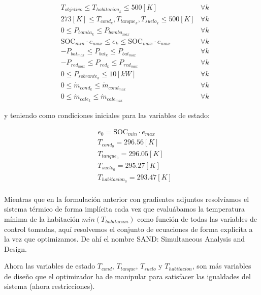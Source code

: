 \begin{align}
	 & T_{objetivo} \leq T_{habitacion_k} \leq 500[K]  \label{eq:min_t_habitacion_constraint_sand} & \forall k \\
	 & 273[K] \leq T_{cond_k}, T_{tanque_k}, T_{suelo_k} \leq 500[K]                               & \forall k \\
	 & 0 \leq P_{bomba_k} \leq P_{bomba_{max}} \quad                                               & \forall k \\
	 & \text{SOC}_{min} \cdot e_{max} \leq e_k \leq \text{SOC}_{max} \cdot e_{max} \quad           & \forall k \\
	 & -P_{bat_{max}} \leq P_{bat_k} \leq P_{bat_{max}} \quad                                      & \forall k \\
	 & -P_{red_{max}} \leq P_{red_k} \leq P_{red_{max}} \quad                                      & \forall k \\
	 & 0 \leq P_{sobrante_k} \leq 10[kW] \quad                                                     & \forall k \\
	 & 0 \leq \dot{m}_{cond_k} \leq \dot{m}_{cond_{max}} \quad                                     & \forall k \\
	 & 0 \leq \dot{m}_{cale_k} \leq \dot{m}_{cale_{max}} \quad                                     & \forall k
\end{align}

y teniendo como condiciones iniciales para las variables de estado:

\begin{align}
	 & e_0 = \text{SOC}_{min} \cdot e_{max} \\
	 & T_{cond_0} = 296.56 [K]              \\
	 & T_{tanque_0} = 296.05[K]             \\
	 & T_{suelo_0} = 295.27[K]              \\
	 & T_{habitacion_0} = 293.47[K]         \\
\end{align}


Mientras que en la formulación anterior con gradientes adjuntos resolvíamos el
sistema térmico de forma implícita cada vez que evaluábamos la temperatura
mínima de la habitación $min(T_{habitacion})$ como función de todas las
variables de control tomadas, aquí resolvemos el conjunto de ecuaciones de
forma explícita a la vez que optimizamos. De ahí el nombre SAND: Simultaneous
Analysis and Design.

Ahora las variables de estado $T_{cond}$, $T_{tanque}$, $T_{suelo}$ y
$T_{habitacion}$, son más variables de diseño que el optimizador ha de
manipular para satisfacer las igualdades del sistema (ahora restricciones).


